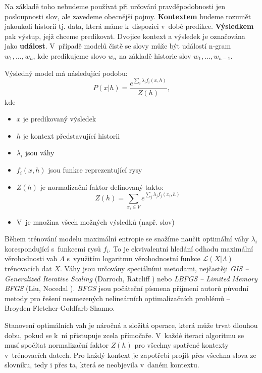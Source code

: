 \documentclass[12pt,a4paper]{report}
\begin{document}
Na základě toho nebudeme používat při určování pravděpodobnosti jen posloupnosti slov, ale zavedeme obecnější pojmy. \textbf{Kontextem} budeme rozumět jakoukoli historii tj. data, která máme k~dispozici v~době predikce. \textbf{Výsledkem} pak výstup, jejž chceme predikovat. Dvojice kontext a výsledek je označována jako \textbf{událost}. V~případě modelů čistě se slovy může být událostí n-gram $w_1, \ldots, w_n$, kde predikujeme slovo $w_n$ na základě historie slov $w_1, \ldots, w_{n-1}$.

Výsledný model má následující podobu:
\begin{equation}
P(x|h) = \frac{e^{\sum_i \lambda_i f_i(x,h)}}{Z(h)},
\end{equation}
kde \begin{itemize} 
\item{$x$ je predikovaný výsledek}
\item{$h$ je kontext představující historii}
\item{$\lambda_i$ jsou váhy}
\item{$f_i(x,h)$ jsou funkce reprezentující rysy}
\item{$Z(h)$ je normalizační faktor definovaný takto:
\begin{equation}
Z(h) = \sum_{x_i \in V} e^{\sum_j \lambda_j f_j(x_i,h)}
\end{equation} }
\item{V~je množina všech možných výsledků (např. slov)}
\end{itemize}

Během trénování modelu maximální entropie se snažíme naučit optimální váhy $\lambda_i$ korespondující s~funkcemi rysů $f_i$. To je ekvivalentní hledání odhadu maximální věrohodnosti vah $\Lambda$ s~využitím logaritmu věrohodnostní funkce $\mathcal{L}(X|\Lambda)$ trénovacích dat $X$. Váhy jsou určovány speciálními metodami, nejčastěji \textit{GIS -- Generalized Iterative Scaling} (Darroch, Ratcliff \cite{gis}) nebo \textit{LBFGS -- Limited Memory BFGS} (Liu, Nocedal \cite{lbfgs}). \textit{BFGS} jsou počáteční písmena příjmení autorů původní metody pro řešení neomezených nelineárních optimalizačních problémů -- Broyden-Fletcher-Goldfarb-Shanno.

Stanovení optimálních vah je náročná a složitá operace, která může trvat dlouhou dobu, pokud se k~ní přistupuje zcela přímočaře. V~každé iteraci algoritmu se musí spočítat normalizační faktor $Z(h)$ pro všechny spatřené kontexty v~trénovacích datech. Pro každý kontext je zapotřebí projít přes všechna slova ze slovníku, tedy i přes ta, která se neobjevila v~daném kontextu.
\end{document}
